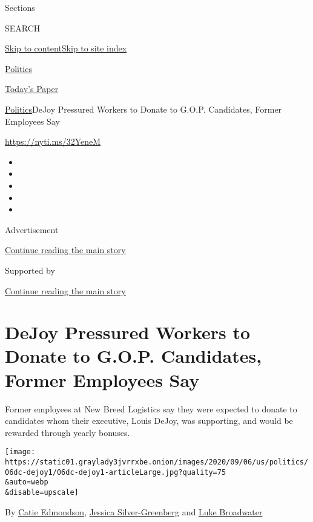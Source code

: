Sections

SEARCH

\protect\hyperlink{site-content}{Skip to
content}\protect\hyperlink{site-index}{Skip to site index}

\href{https://www.nytimes3xbfgragh.onion/section/politics}{Politics}

\href{https://myaccount.nytimes3xbfgragh.onion/auth/login?response_type=cookie\&client_id=vi}{}

\href{https://www.nytimes3xbfgragh.onion/section/todayspaper}{Today's
Paper}

\href{/section/politics}{Politics}\textbar{}DeJoy Pressured Workers to
Donate to G.O.P. Candidates, Former Employees Say

\url{https://nyti.ms/32YeneM}

\begin{itemize}
\item
\item
\item
\item
\item
\end{itemize}

Advertisement

\protect\hyperlink{after-top}{Continue reading the main story}

Supported by

\protect\hyperlink{after-sponsor}{Continue reading the main story}

\hypertarget{dejoy-pressured-workers-to-donate-to-gop-candidates-former-employees-say}{%
\section{DeJoy Pressured Workers to Donate to G.O.P. Candidates, Former
Employees
Say}\label{dejoy-pressured-workers-to-donate-to-gop-candidates-former-employees-say}}

Former employees at New Breed Logistics say they were expected to donate
to candidates whom their executive, Louis DeJoy, was supporting, and
would be rewarded through yearly bonuses.

\texttt{[image: https://static01.graylady3jvrrxbe.onion/images/2020/09/06/us/politics/06dc-dejoy1/06dc-dejoy1-articleLarge.jpg?quality=75\\\&auto=webp\\\&disable=upscale]}

By \href{https://www.nytimes3xbfgragh.onion/by/catie-edmondson}{Catie
Edmondson},
\href{https://www.nytimes3xbfgragh.onion/by/jessica-silver-greenberg}{Jessica
Silver-Greenberg} and
\href{https://www.nytimes3xbfgragh.onion/by/luke-broadwater}{Luke
Broadwater}

